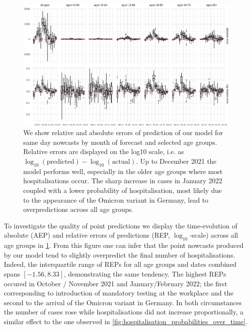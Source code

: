 \begin{figure}

    {\centering \includegraphics[width=\textwidth]{figures_tentative/REP-1} 

}

\caption{
We show relative and absolute errors of prediction of our model for same day nowcasts by month of forecast and selected age groups. 
Relative errors are displayed on the log10 scale, i.e. as $\log_{10} (\text{predicted}) - \log_{10} (\text{actual})$.
Up to December 2021 the model performs well, especially in the older age groups where most hospitalisations occur. 
The sharp increase in cases in January 2022 coupled with a lower probability of hospitalisation, most likely due to the appearance of the Omicron variant in Germany, lead to overpredictions across all age groups.
}\label{fig:REP}
\end{figure}

To investigate the quality of point predictions we display the
time-evolution of absolute (AEP) and relative errors of predictions
(REP, \(\log_{10}\)-scale) across all age groups in 
\cref{fig:REP}. From this figure one can infer that the point nowcasts
produced by our model tend to slightly overpredict the final number of
hospitalisations. Indeed, the interquartile range of REPs for all age
groups and dates combined spans \([-1.56, 8.33]\), demonstrating the
same tendency. The highest REPs occured in October / November 2021 and
January/February 2022; the first corresponding to introduction of
mandatory testing at the workplace and the second to the arrival of the
Omicron variant in Germany. In both circumstances the number of cases
rose while hospitalisations did not increase proportionally, a similar
effect to the one observed in 
\cref{fig:hospitalisation_probabilities_over_time}.

